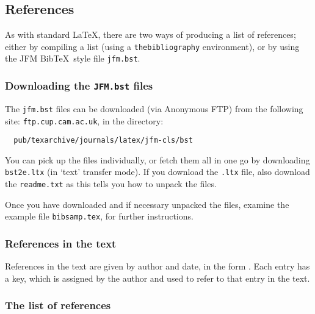 \documentclass{jfm}
\begin{document}
\subsection{References}

As with standard \LaTeX, there are two ways of producing a list of
references; either by compiling a list (using a \verb"thebibliography"
environment), or by using the JFM Bib\TeX\ style file \verb"jfm.bst".

\subsubsection{Downloading the {\tt JFM.bst} files}

The \verb"jfm.bst" files can be downloaded (via Anonymous FTP) from the
following site: \verb"ftp.cup.cam.ac.uk", in the directory:
%
\begin{verbatim}
  pub/texarchive/journals/latex/jfm-cls/bst
\end{verbatim}
%
You can pick up the files individually, or fetch them all in one go by
downloading \verb"bst2e.ltx" (in `text' transfer mode). If you
download the \verb".ltx" file, also download the \verb"readme.txt"
as this tells you how to unpack the files.

Once you have downloaded and if necessary unpacked the files, examine the
example file \verb"bibsamp.tex", for further instructions.

\subsubsection{References in the text}

References in the text are given by author and date, in the form
\cite{Den85}. Each  entry has a key, which is assigned by the author
and used to refer to that entry in the text.

\subsubsection{The list of references}
\end{document}
